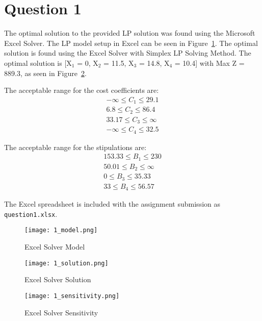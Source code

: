 \section*{Question 1}
The optimal solution to the provided LP solution was found using the Microsoft Excel Solver. The LP model setup in Excel can be seen in Figure~\ref{fig:q1_model}. The optimal solution is found using the Excel Solver with Simplex LP Solving Method. The optimal solution is [X$_1$ = 0, X$_2$ = 11.5, X$_3$ = 14.8, X$_4$ = 10.4] with Max Z = 889.3, as seen in Figure~\ref{fig:q1_answer}.

The acceptable range for the cost coefficients are:
\begin{gather*}
	-\infty \leq C_1 \leq 29.1 \\
	6.8 \leq C_2 \leq 86.4 \\
	33.17 \leq C_3 \leq \infty \\
	-\infty \leq C_4 \leq 32.5
\end{gather*}

The acceptable range for the stipulations are:
\begin{gather*}
	153.33 \leq B_1 \leq 230 \\
	50.01 \leq B_2 \leq \infty \\
	0 \leq B_3 \leq 35.33 \\
	33 \leq B_4 \leq 56.57
\end{gather*}

The Excel spreadsheet is included with the assignment submission as \texttt{question1.xlsx}.

\begin{figure}[htp]
    \centering
    \texttt{[image: 1\_model.png]}
    \caption{\label{fig:q1_model}Excel Solver Model}
\end{figure}

\begin{figure}[htp]
    \centering
    \texttt{[image: 1\_solution.png]}
    \caption{\label{fig:q1_answer}Excel Solver Solution}
\end{figure}

\begin{figure}[htp]
    \centering
    \texttt{[image: 1\_sensitivity.png]}
    \caption{\label{fig:q1_sensitivity}Excel Solver Sensitivity}
\end{figure}